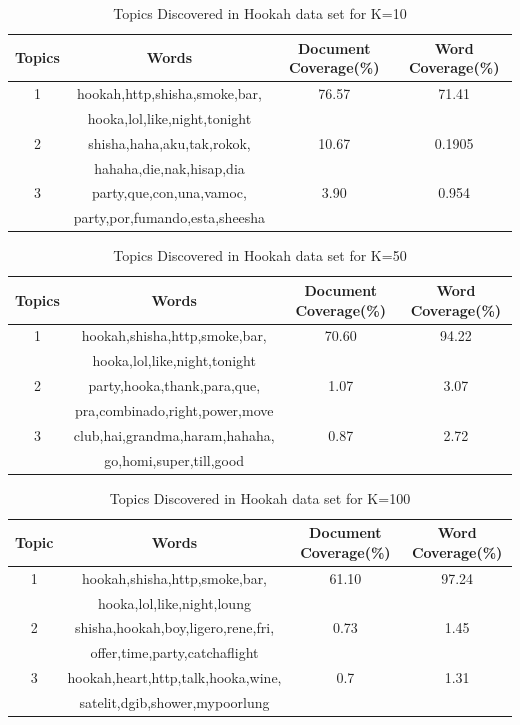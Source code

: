 \documentclass[11pt,a4paper,oneside]{article}
\begin{document}
\begin{table}
\begin{tabular}{|c|c|c|c|}
\hline 
Topics & Words & Document Coverage(\%) & Word Coverage(\%) \\ 
\hline 
1 & hookah,http,shisha,smoke,bar, & 76.57 & 71.41 \\ 
& hooka,lol,like,night,tonight & & \\
\hline 
2 & shisha,haha,aku,tak,rokok, & 10.67 & 0.1905 \\ 
& hahaha,die,nak,hisap,dia & & \\
\hline 
3 & party,que,con,una,vamoc, & 3.90 & 0.954 \\ 
& party,por,fumando,esta,sheesha & & \\
\hline 
\end{tabular}
\caption{Topics Discovered in Hookah data set for K=10}
\label{table:k=10_hookah}
\end{table}

\begin{table}
\begin{tabular}{|c|c|c|c|}
\hline 
Topics & Words & Document Coverage(\%) & Word Coverage(\%) \\ 
\hline 
1 & hookah,shisha,http,smoke,bar, & 70.60 & 94.22 \\ 
& hooka,lol,like,night,tonight & & \\
\hline 
2 & party,hooka,thank,para,que, & 1.07 & 3.07 \\ 
& pra,combinado,right,power,move & & \\
\hline 
3 & club,hai,grandma,haram,hahaha, & 0.87 & 2.72 \\ 
& go,homi,super,till,good & & \\
\hline 
\end{tabular}
\caption{Topics Discovered in Hookah data set for K=50}
\label{table:k=50_hookah}
\end{table}

\begin{table}
\begin{tabular}{|c|c|c|c|}
\hline 
Topic & Words & Document Coverage(\%) & Word Coverage(\%) \\ 
\hline 
1 & hookah,shisha,http,smoke,bar, & 61.10 & 97.24 \\ 
& hooka,lol,like,night,loung & & \\
\hline 
2 & shisha,hookah,boy,ligero,rene,fri, & 0.73 & 1.45 \\ 
& offer,time,party,catchaflight & & \\
\hline 
3 & hookah,heart,http,talk,hooka,wine, & 0.7 & 1.31 \\ 
& satelit,dgib,shower,mypoorlung & & \\
\hline 
\end{tabular}
\caption{Topics Discovered in Hookah data set for K=100}
\label{table:k=100_hookah}
\end{table}
\end{document}
